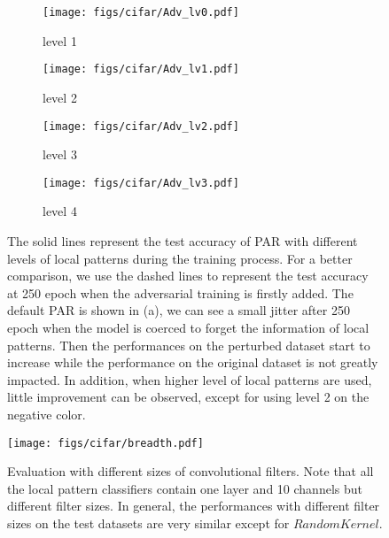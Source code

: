 \documentclass{article}
\begin{document}
\begin{figure}[h!]
  \centering
    \begin{subfigure}{.49\textwidth}
      \centering
      \texttt{[image: figs/cifar/Adv\_lv0.pdf]}
      \caption{level 1}
      \label{process}
    \end{subfigure}
    \begin{subfigure}{.49\textwidth}
      \centering
      \texttt{[image: figs/cifar/Adv\_lv1.pdf]}
      \caption{level 2}
    \end{subfigure}
    \begin{subfigure}{.49\textwidth}
      \centering
      \texttt{[image: figs/cifar/Adv\_lv2.pdf]}
      \caption{level 3}
    \end{subfigure}
    \begin{subfigure}{.49\textwidth}
      \centering
      \texttt{[image: figs/cifar/Adv\_lv3.pdf]}
      \caption{level 4}
    \end{subfigure}
\caption{The solid lines represent the test accuracy of PAR with different levels of local patterns during the training process. For a better comparison, we use the dashed lines to represent the test accuracy at 250 epoch when the adversarial training is firstly added. The default PAR is shown in (a), we can see a small jitter after 250 epoch when the model is coerced to forget the information of local patterns. Then the performances on the perturbed dataset start to increase while the performance on the original dataset is not greatly impacted. In addition, when higher level of local patterns are used, little improvement can be observed, except for using level 2 on the negative color.}
\label{fig:higher}
\end{figure}


\begin{figure}[!h]
    \centering
    \texttt{[image: figs/cifar/breadth.pdf]}
    \caption{Evaluation with different sizes of convolutional filters. Note that all the local pattern classifiers contain one layer and 10 channels but different filter sizes. In general, the performances with different filter sizes on the test datasets are very similar except for $RandomKernel$.}
    \label{fig:breath}
\end{figure}

\clearpage
\end{document}
